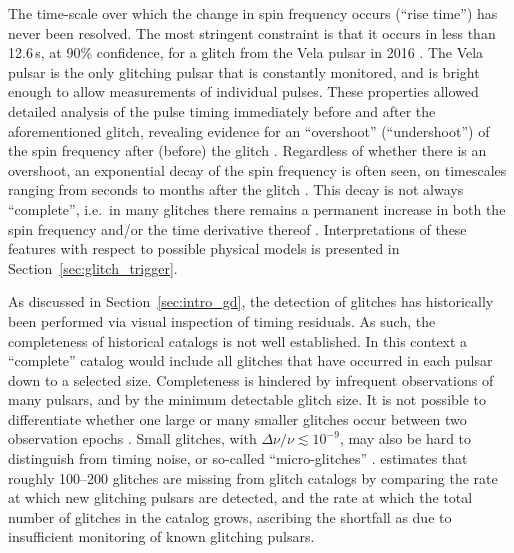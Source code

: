 The time-scale over which the change in spin frequency occurs (``rise time'') has never been resolved. The most stringent constraint is that it occurs in less than 12.6\,s, at 90\% confidence, for a glitch from the Vela pulsar in 2016 \citep{Palfreyman2018,Ashton2019}. The Vela pulsar is the only glitching pulsar that is constantly monitored, and is bright enough to allow measurements of individual pulses. These properties allowed detailed analysis of the pulse timing immediately before and after the aforementioned glitch, revealing evidence for an ``overshoot'' (``undershoot'') of the spin frequency after (before) the glitch \citep{Ashton2019}. Regardless of whether there is an overshoot, an exponential decay of the spin frequency is often seen, on timescales ranging from seconds to months after the glitch \citep{Yu2013,Ashton2019}. This decay is not always ``complete'', i.e.~in many glitches there remains a permanent increase in both the spin frequency and/or the time derivative thereof \citep{Hobbs2010,Espinoza2011,Dang2020}. Interpretations of these features with respect to possible physical models is presented in Section~\ref{sec:glitch_trigger}.

As discussed in Section~\ref{sec:intro_gd}, the detection of glitches has historically been performed via visual inspection of timing residuals. As such, the completeness of historical catalogs is not well established. In this context a ``complete'' catalog would include all glitches that have occurred in each pulsar down to a selected size. Completeness is hindered by infrequent observations of many pulsars, and by the minimum detectable glitch size. It is not possible to differentiate whether one large or many smaller glitches occur between two observation epochs \citep{Janssen2006,Yu2017b}. Small glitches, with $\Delta \nu / \nu \lesssim 10^{-9}$, may also be hard to distinguish from timing noise, or so-called ``micro-glitches'' \citep{Janssen2006,Chukwude2010}. \citet{Howitt2020} estimates that roughly 100--200 glitches are missing from glitch catalogs by comparing the rate at which new glitching pulsars are detected, and the rate at which the total number of glitches in the catalog grows, ascribing the shortfall as due to insufficient monitoring of known glitching pulsars.

